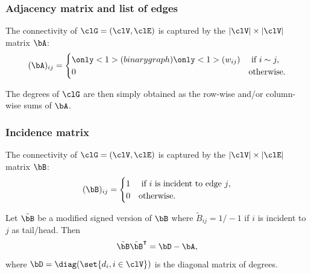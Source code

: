 \begin{frame}
  \frametitle{Adjacency matrix and list of edges}

  \begin{definition}
    The connectivity of  $\clG = (\clV,\clE)$ is captured by the $|\clV|\times |\clV|$ matrix $\bA$:
    \[
      (\bA)_{ij} = \begin{cases}
      \only<1>{(binary graph)}\only<1>{(w_{ij})}  & \text{ if } i \sim j,\\
      0  & \text{otherwise}.
      \end{cases}
    \]
  \end{definition}

  \begin{proposition}
    The degrees of $\clG$ are then simply obtained as the row-wise and/or column-wise sums of $\bA$.
  \end{proposition}

\end{frame}

\begin{frame}
  \frametitle{Incidence matrix}

  \begin{definition}
    The connectivity of $\clG = (\clV,\clE)$ is captured by the $|\clV|\times |\clE|$ matrix $\bB$:
    \[
      (\bB)_{ij} = \begin{cases}
      1  & \text{ if $i$ is incident to edge $j$},\\
      0  & \text{otherwise}.
      \end{cases}
    \]
  \end{definition}

  \begin{proposition}[Relationship]
    Let $\tilde\bB$ be a modified \alert{signed} version of $\bB$ where $\tilde{\! B}_{ij}= 1/-1$ if $i$ is incident to $j$ as tail/head. Then
    \[
      \tilde \bB \tilde \bB^\intercal = \bD - \bA,
    \]
    where $\bD = \diag(\set{d_i, i\in\clV})$ is the diagonal matrix of degrees. 
  \end{proposition}

\end{frame}

